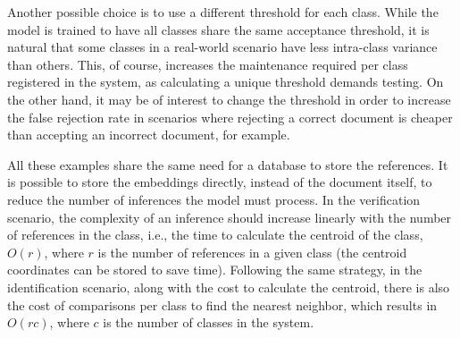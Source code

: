 Another possible choice is to use a different threshold for each class. While the model is trained to have all classes share the same acceptance threshold, it is natural that some classes in a real-world scenario have less intra-class variance than others. This, of course, increases the maintenance required per class registered in the system, as calculating a unique threshold demands testing. On the other hand, it may be of interest to change the threshold in order to increase the false rejection rate in scenarios where rejecting a correct document is cheaper than accepting an incorrect document, for example.

All these examples share the same need for a database to store the references. It is possible to store the embeddings directly, instead of the document itself, to reduce the number of inferences the model must process. In the verification scenario, the complexity of an inference should increase linearly with the number of references in the class, i.e., the time to calculate the centroid of the class, $O(r)$, where $r$ is the number of references in a given class (the centroid coordinates can be stored to save time). Following the same strategy, in the identification scenario, along with the cost to calculate the centroid, there is also the cost of comparisons per class to find the nearest neighbor, which results in $O(rc)$, where $c$ is the number of classes in the system.

